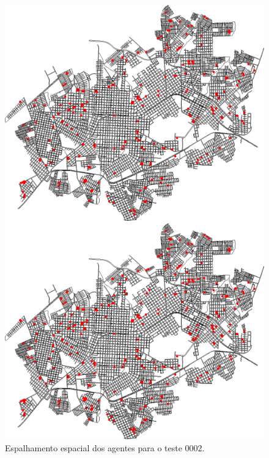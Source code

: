 \begin{figure}[H]
\begin{minipage}{.5\textwidth}
    \captionsetup{labelformat=empty}
  \end{minipage}
  \begin{minipage}{.5\textwidth}
    \centering
    \includegraphics[width=1.0\textwidth]{Figuras/Resultados/0002/Saidas/MonteCarlo_0/Simulacao_0/Acumulado/00016.png}
    \captionsetup{labelformat=empty}
  \end{minipage}%
  \begin{minipage}{.5\textwidth}
    \centering
    \includegraphics[width=1.0\textwidth]{Figuras/Resultados/0002/Saidas/MonteCarlo_0/Simulacao_0/Acumulado/00020.png}
    \captionsetup{labelformat=empty}
  \end{minipage}
  \caption{Espalhamento espacial dos agentes para o teste 0002.}
  \label{fig:espacial_0002}
\end{figure}

